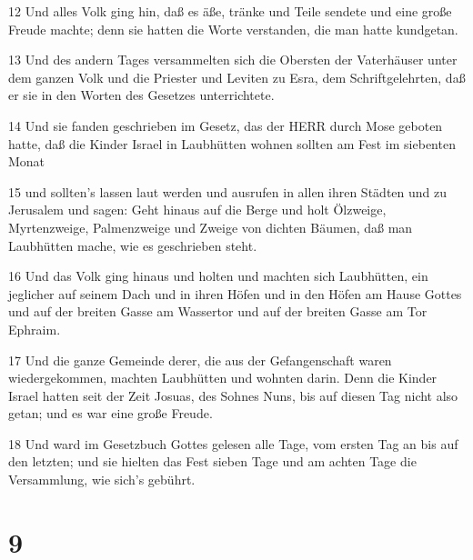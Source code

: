 \par 12 Und alles Volk ging hin, daß es äße, tränke und Teile sendete und eine große Freude machte; denn sie hatten die Worte verstanden, die man hatte kundgetan.
\par 13 Und des andern Tages versammelten sich die Obersten der Vaterhäuser unter dem ganzen Volk und die Priester und Leviten zu Esra, dem Schriftgelehrten, daß er sie in den Worten des Gesetzes unterrichtete.
\par 14 Und sie fanden geschrieben im Gesetz, das der HERR durch Mose geboten hatte, daß die Kinder Israel in Laubhütten wohnen sollten am Fest im siebenten Monat
\par 15 und sollten's lassen laut werden und ausrufen in allen ihren Städten und zu Jerusalem und sagen: Geht hinaus auf die Berge und holt Ölzweige, Myrtenzweige, Palmenzweige und Zweige von dichten Bäumen, daß man Laubhütten mache, wie es geschrieben steht.
\par 16 Und das Volk ging hinaus und holten und machten sich Laubhütten, ein jeglicher auf seinem Dach und in ihren Höfen und in den Höfen am Hause Gottes und auf der breiten Gasse am Wassertor und auf der breiten Gasse am Tor Ephraim.
\par 17 Und die ganze Gemeinde derer, die aus der Gefangenschaft waren wiedergekommen, machten Laubhütten und wohnten darin. Denn die Kinder Israel hatten seit der Zeit Josuas, des Sohnes Nuns, bis auf diesen Tag nicht also getan; und es war eine große Freude.
\par 18 Und ward im Gesetzbuch Gottes gelesen alle Tage, vom ersten Tag an bis auf den letzten; und sie hielten das Fest sieben Tage und am achten Tage die Versammlung, wie sich's gebührt.

\chapter{9}

